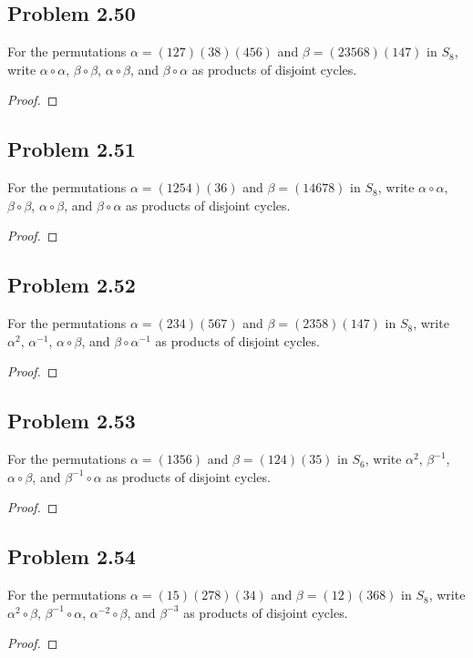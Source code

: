 \documentclass{amsbook}
\begin{document}
			\subsection*{Problem 2.50}
			\label{sub:problem_2_50}
			For the permutations $\alpha = (127)(38)(456)$ and $\beta = (23568)(147)$ in $S_{8}$, write $\alpha \circ \alpha$, $\beta \circ \beta$, $\alpha \circ \beta$, and $\beta \circ \alpha$ as products of disjoint cycles.
			\begin{proof}
			\end{proof}

			\subsection*{Problem 2.51}
			\label{sub:problem_2_51}
			For the permutations $\alpha = (1254)(36)$ and $\beta = (14678)$ in $S_{8}$, write $\alpha \circ \alpha$, $\beta \circ \beta$, $\alpha \circ \beta$, and $\beta \circ \alpha$ as products of disjoint cycles.
			\begin{proof}
			\end{proof}

			\subsection*{Problem 2.52}
			\label{sub:problem_2_52}
			For the permutations $\alpha = (234)(567)$ and $\beta = (2358)(147)$ in $S_{8}$, write $\alpha^{2}$, $\alpha^{-1}$, $\alpha \circ \beta$, and $\beta \circ \alpha^{-1}$ as products of disjoint cycles.
			\begin{proof}
			\end{proof}

			\subsection*{Problem 2.53}
			\label{sub:problem_2_53}
			For the permutations $\alpha = (1356)$ and $\beta = (124)(35)$ in $S_{6}$, write $\alpha^{2}$, $\beta^{-1}$, $\alpha \circ \beta$, and $\beta^{-1} \circ \alpha$ as products of disjoint cycles.
			\begin{proof}
			\end{proof}

			\subsection*{Problem 2.54}
			\label{sub:problem_2_54}
			For the permutations $\alpha = (15)(278)(34)$ and $\beta = (12)(368)$ in $S_{8}$, write $\alpha^{2} \circ \beta$, $\beta^{-1} \circ \alpha$, $\alpha^{-2} \circ \beta$, and $\beta^{-3}$ as products of disjoint cycles.
			\begin{proof}
			\end{proof}
\end{document}
